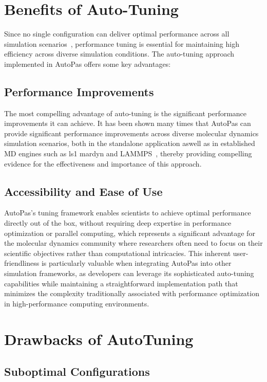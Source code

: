 \documentclass[conference]{IEEEtran}
\begin{document}
\section{Benefits of Auto-Tuning}

Since no single configuration can deliver optimal performance across all simulation scenarios~\cite{Tchipev2020}, performance tuning is essential for maintaining high efficiency across diverse simulation conditions. The auto-tuning approach implemented in AutoPas offers some key advantages:

\subsection*{Performance Improvements}

The most compelling advantage of auto-tuning is the significant performance improvements it can achieve. It has been shown many times that AutoPas can provide significant performance improvements across diverse molecular dynamics simulation scenarios, both in the standalone application aswell as in established MD engines such as ls1 mardyn and LAMMPS~\cite{SECKLER2021101296}\cite{Gratl2022AutoPas}, thereby providing compelling evidence for the effectiveness and importance of this approach.

\subsection*{Accessibility and Ease of Use}
AutoPas's tuning framework enables scientists to achieve optimal performance directly out of the box, without requiring deep expertise in performance optimization or parallel computing, which represents a significant advantage for the molecular dynamics community where researchers often need to focus on their scientific objectives rather than computational intricacies. This inherent user-friendliness is particularly valuable when integrating AutoPas into other simulation frameworks, as developers can leverage its sophisticated auto-tuning capabilities while maintaining a straightforward implementation path that minimizes the complexity traditionally associated with performance optimization in high-performance computing environments.

\section{Drawbacks of AutoTuning}

\subsection*{Suboptimal Configurations}
\end{document}
